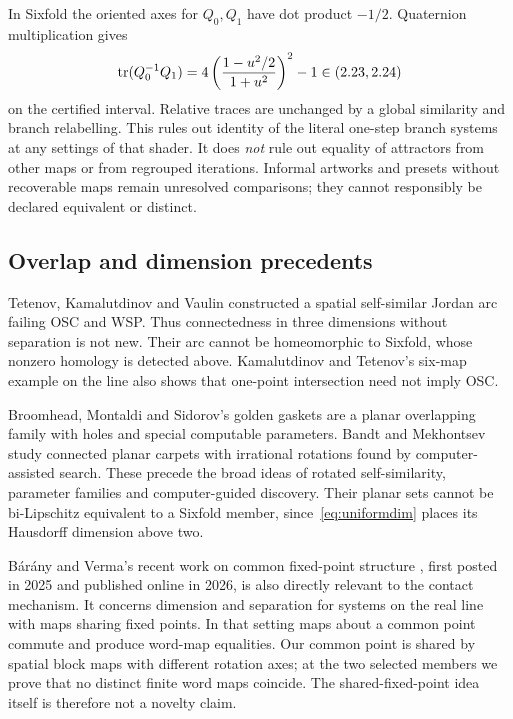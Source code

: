 In Sixfold the oriented axes for $Q_0,Q_1$ have dot product $-1/2$.
Quaternion multiplication gives
\begin{equation}\label{eq:shader}
\operatorname{tr}(Q_0^{-1}Q_1)=4\left(\frac{1-u^2/2}{1+u^2}\right)^2-1
\in(2.23,2.24)
\end{equation}
on the certified interval. Relative traces are unchanged by a global
similarity and branch relabelling. This rules out identity of the literal
one-step branch systems at any settings of that shader. It does \emph{not}
rule out equality of attractors from other maps or from regrouped iterations.
Informal artworks and presets without recoverable maps remain unresolved
comparisons; they cannot responsibly be declared equivalent or distinct.

\subsection{Overlap and dimension precedents}
Tetenov, Kamalutdinov and Vaulin \cite{arc} constructed a spatial
self-similar Jordan arc failing OSC and WSP. Thus connectedness in three
dimensions without separation is not new. Their arc cannot be homeomorphic
to Sixfold, whose nonzero homology is detected above. Kamalutdinov and
Tetenov's six-map example on the line \cite{uniquecontact} also shows that
one-point intersection need not imply OSC.

Broomhead, Montaldi and Sidorov's golden gaskets \cite{golden} are a planar
overlapping family with holes and special computable parameters. Bandt and
Mekhontsev \cite{bandt} study connected planar carpets with irrational
rotations found by computer-assisted search. These precede the broad ideas
of rotated self-similarity, parameter families and computer-guided discovery.
Their planar sets cannot be bi-Lipschitz equivalent to a Sixfold member,
since~\eqref{eq:uniformdim} places its Hausdorff dimension above two.

B\'ar\'any and Verma's recent work on common fixed-point structure
\cite{baranyverma}, first posted in 2025 and published online in 2026,
is also directly relevant to the contact mechanism. It concerns dimension
and separation for systems on the real line with maps sharing fixed points.
In that setting maps about a common point commute and produce word-map
equalities. Our common point is shared by spatial block maps with different
rotation axes; at the two selected members we prove that no distinct finite
word maps coincide. The shared-fixed-point idea itself is therefore not a
novelty claim.

